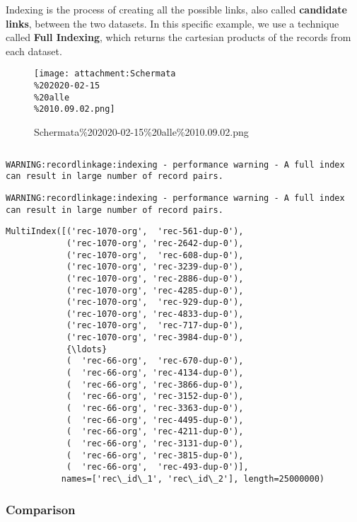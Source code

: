 \documentclass{article}
\begin{document}
Indexing is the process of creating all the possible links, also called
\textbf{candidate links}, between the two datasets. In this specific
example, we use a technique called \textbf{Full Indexing}, which returns
the cartesian products of the records from each dataset.

    \begin{figure}
\centering
\texttt{[image: attachment:Schermata\\\%202020-02-15\\\%20alle\\\%2010.09.02.png]}
\caption{Schermata\%202020-02-15\%20alle\%2010.09.02.png}
\end{figure}

    \begin{Verbatim}[commandchars=\\\{\}]

\end{Verbatim}

    \begin{Verbatim}[commandchars=\\\{\}]
WARNING:recordlinkage:indexing - performance warning - A full index can result in large number of record pairs.

    \end{Verbatim}

    \begin{Verbatim}[commandchars=\\\{\}]
WARNING:recordlinkage:indexing - performance warning - A full index can result in large number of record pairs.

    \end{Verbatim}
\begin{Verbatim}[commandchars=\\\{\}]
MultiIndex([('rec-1070-org',  'rec-561-dup-0'),
            ('rec-1070-org', 'rec-2642-dup-0'),
            ('rec-1070-org',  'rec-608-dup-0'),
            ('rec-1070-org', 'rec-3239-dup-0'),
            ('rec-1070-org', 'rec-2886-dup-0'),
            ('rec-1070-org', 'rec-4285-dup-0'),
            ('rec-1070-org',  'rec-929-dup-0'),
            ('rec-1070-org', 'rec-4833-dup-0'),
            ('rec-1070-org',  'rec-717-dup-0'),
            ('rec-1070-org', 'rec-3984-dup-0'),
            {\ldots}
            (  'rec-66-org',  'rec-670-dup-0'),
            (  'rec-66-org', 'rec-4134-dup-0'),
            (  'rec-66-org', 'rec-3866-dup-0'),
            (  'rec-66-org', 'rec-3152-dup-0'),
            (  'rec-66-org', 'rec-3363-dup-0'),
            (  'rec-66-org', 'rec-4495-dup-0'),
            (  'rec-66-org', 'rec-4211-dup-0'),
            (  'rec-66-org', 'rec-3131-dup-0'),
            (  'rec-66-org', 'rec-3815-dup-0'),
            (  'rec-66-org',  'rec-493-dup-0')],
           names=['rec\_id\_1', 'rec\_id\_2'], length=25000000)
\end{Verbatim}
    \hypertarget{comparison}{%
\subsubsection{Comparison}\label{comparison}}
\end{document}
